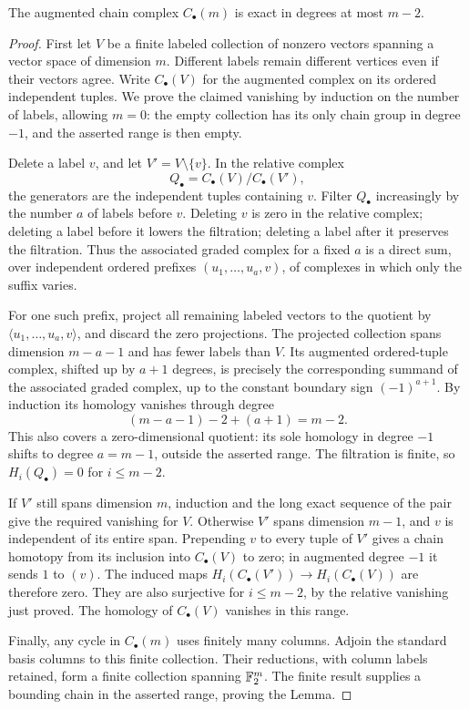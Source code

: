 \begin{lemma}\label{lem:ordered-frames}
The augmented chain complex $C_\bullet(m)$ is exact in degrees at
most $m-2$.
\end{lemma}

\begin{proof}
First let $V$ be a finite labeled collection of nonzero vectors
spanning a vector space of dimension $m$. Different labels remain
different vertices even if their vectors agree. Write $C_\bullet(V)$
for the augmented complex on its ordered independent tuples. We prove
the claimed vanishing by induction on the number of labels, allowing
$m=0$: the empty collection has its only chain group in degree $-1$,
and the asserted range is then empty.

Delete a label $v$, and let $V'=V\setminus\{v\}$. In the relative
complex
\[
 Q_\bullet=C_\bullet(V)/C_\bullet(V'),
\]
the generators are the independent tuples containing $v$.
Filter $Q_\bullet$ increasingly by the number $a$ of labels before
$v$. Deleting $v$ is zero in the relative complex; deleting a label
before it lowers the filtration; deleting a label after it preserves
the filtration. Thus the associated graded complex for a fixed $a$
is a direct sum, over independent ordered prefixes
$(u_1,\ldots,u_a,v)$, of complexes in which only the suffix varies.

For one such prefix, project all remaining labeled vectors to the
quotient by $\langle u_1,\ldots,u_a,v\rangle$, and discard the zero
projections. The projected collection spans dimension $m-a-1$ and
has fewer labels than $V$. Its augmented ordered-tuple complex,
shifted up by $a+1$ degrees, is precisely the corresponding summand
of the associated graded complex, up to the constant boundary sign
$(-1)^{a+1}$. By induction its homology vanishes through degree
\[
 (m-a-1)-2+(a+1)=m-2.
\]
This also covers a zero-dimensional quotient: its sole homology in
degree $-1$ shifts to degree $a=m-1$, outside the asserted range.
The filtration is finite, so $H_i(Q_\bullet)=0$ for $i\leq m-2$.

If $V'$ still spans dimension $m$, induction and the long exact
sequence of the pair give the required vanishing for $V$.
Otherwise $V'$ spans dimension $m-1$, and $v$ is independent of its
entire span. Prepending $v$ to every tuple of $V'$ gives a chain
homotopy from its inclusion into $C_\bullet(V)$ to zero; in
augmented degree $-1$ it sends $1$ to $(v)$. The induced maps
$H_i(C_\bullet(V'))\to H_i(C_\bullet(V))$ are therefore zero.
They are also surjective for $i\leq m-2$, by the relative vanishing
just proved. The homology of $C_\bullet(V)$ vanishes in this range.

Finally, any cycle in $C_\bullet(m)$ uses finitely many columns.
Adjoin the standard basis columns to this finite collection. Their
reductions, with column labels retained, form a finite collection
spanning $\mathbb F_2^m$. The finite result supplies a bounding chain in
the asserted range, proving the Lemma.
\end{proof}

